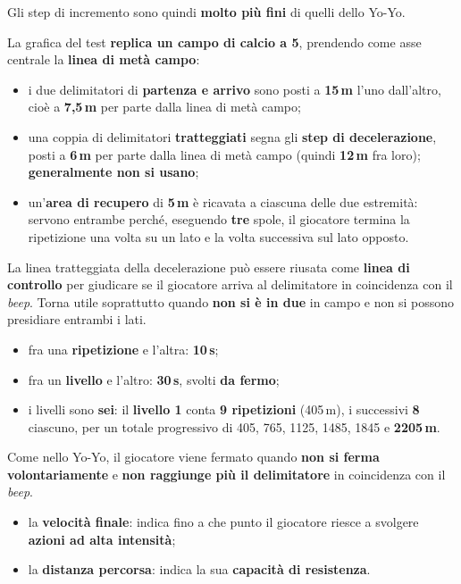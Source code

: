 Gli step di incremento sono quindi \textbf{molto più fini} di quelli dello Yo-Yo.

La grafica del test \textbf{replica un campo di calcio a 5}, prendendo come asse centrale la
\textbf{linea di metà campo}:

\begin{itemize}
  \item i due delimitatori di \textbf{partenza e arrivo} sono posti a \textbf{15\,m} l'uno
    dall'altro, cioè a \textbf{7,5\,m} per parte dalla linea di metà campo;
  \item una coppia di delimitatori \textbf{tratteggiati} segna gli \textbf{step di decelerazione},
    posti a \textbf{6\,m} per parte dalla linea di metà campo (quindi \textbf{12\,m} fra loro);
    \textbf{generalmente non si usano};
  \item un'\textbf{area di recupero} di \textbf{5\,m} è ricavata a ciascuna delle due estremità:
    servono entrambe perché, eseguendo \textbf{tre} spole, il giocatore termina la ripetizione una
    volta su un lato e la volta successiva sul lato opposto.
\end{itemize}

La linea tratteggiata della decelerazione può essere riusata come \textbf{linea di controllo} per
giudicare se il giocatore arriva al delimitatore in coincidenza con il \textit{beep}. Torna utile
soprattutto quando \textbf{non si è in due} in campo e non si possono presidiare entrambi i lati.

\begin{itemize}
  \item fra una \textbf{ripetizione} e l'altra: \textbf{10\,s};
  \item fra un \textbf{livello} e l'altro: \textbf{30\,s}, svolti \textbf{da fermo};
  \item i livelli sono \textbf{sei}: il \textbf{livello 1} conta \textbf{9 ripetizioni} (405\,m), i
    successivi \textbf{8} ciascuno, per un totale progressivo di 405, 765, 1125, 1485, 1845 e
    \textbf{2205\,m}.
\end{itemize}

Come nello Yo-Yo, il giocatore viene fermato quando \textbf{non si ferma volontariamente} e
\textbf{non raggiunge più il delimitatore} in coincidenza con il \textit{beep}.

\begin{itemize}
  \item la \textbf{velocità finale}: indica fino a che punto il giocatore riesce a svolgere
    \textbf{azioni ad alta intensità};
  \item la \textbf{distanza percorsa}: indica la sua \textbf{capacità di resistenza}.
\end{itemize}

